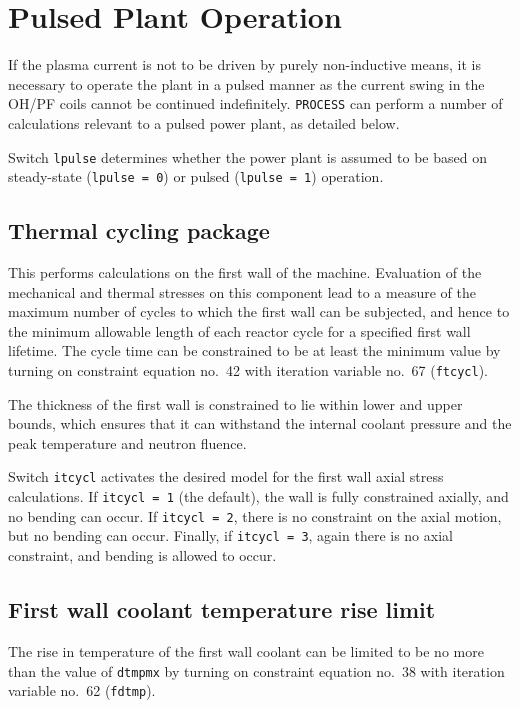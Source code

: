 \documentclass[11pt,a4paper]{report}
\newcommand{\process}{\mbox{\texttt{PROCESS}}}
\begin{document}
\section{Pulsed Plant Operation}
\label{sec:pulsed}

If the plasma current is not to be driven by purely non-inductive means, it is
necessary to operate the plant in a pulsed manner as the current swing in the
OH/PF coils cannot be continued indefinitely. \process\/ can perform a number of
calculations relevant to a pulsed power plant, as detailed below.

Switch \texttt{lpulse} determines whether the power plant is assumed to be
based on steady-state (\texttt{lpulse = 0}) or pulsed (\texttt{lpulse = 1})
operation.

\subsection{Thermal cycling package}

This performs calculations on the first wall of the machine. Evaluation of the
mechanical and thermal stresses on this component lead to a measure of the
maximum number of cycles to which the first wall can be subjected, and hence
to the minimum allowable length of each reactor cycle for a specified first
wall lifetime. The cycle time can be constrained to be at least the minimum
value by turning on constraint equation no.\ 42 with iteration variable no.\
67 (\texttt{ftcycl}).

The thickness of the first wall is constrained to lie within lower and upper
bounds, which ensures that it can withstand the internal coolant pressure and
the peak temperature and neutron fluence.

Switch \texttt{itcycl} activates the desired model for the first wall axial
stress calculations. If \texttt{itcycl = 1} (the default), the wall is fully
constrained axially, and no bending can occur. If \texttt{itcycl = 2}, there
is no constraint on the axial motion, but no bending can occur. Finally, if
\texttt{itcycl = 3}, again there is no axial constraint, and bending is
allowed to occur.

\subsection{First wall coolant temperature rise limit}

The rise in temperature of the first wall coolant can be limited to be no more
than the value of \texttt{dtmpmx} by turning on constraint equation no.\ 38 with
iteration variable no.\ 62 (\texttt{fdtmp}).
\end{document}
